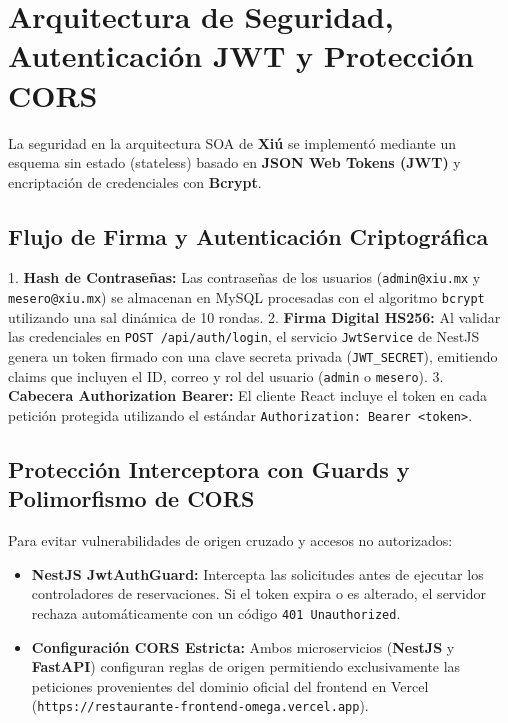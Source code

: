 \documentclass[12pt,a4paper]{article}
\begin{document}
\section{Arquitectura de Seguridad, Autenticación JWT y Protección CORS}

La seguridad en la arquitectura SOA de \textbf{Xiú} se implementó mediante un esquema sin estado (stateless) basado en \textbf{JSON Web Tokens (JWT)} y encriptación de credenciales con \textbf{Bcrypt}.

\subsection{Flujo de Firma y Autenticación Criptográfica}
1. \textbf{Hash de Contraseñas:} Las contraseñas de los usuarios (\texttt{admin@xiu.mx} y \texttt{mesero@xiu.mx}) se almacenan en MySQL procesadas con el algoritmo \texttt{bcrypt} utilizando una sal dinámica de 10 rondas.
2. \textbf{Firma Digital HS256:} Al validar las credenciales en \texttt{POST /api/auth/login}, el servicio \texttt{JwtService} de NestJS genera un token firmado con una clave secreta privada (\texttt{JWT\_SECRET}), emitiendo claims que incluyen el ID, correo y rol del usuario (\texttt{admin} o \texttt{mesero}).
3. \textbf{Cabecera Authorization Bearer:} El cliente React incluye el token en cada petición protegida utilizando el estándar \texttt{Authorization: Bearer <token>}.

\subsection{Protección Interceptora con Guards y Polimorfismo de CORS}
Para evitar vulnerabilidades de origen cruzado y accesos no autorizados:
\begin{itemize}[leftmargin=*]
  \item \textbf{NestJS JwtAuthGuard:} Intercepta las solicitudes antes de ejecutar los controladores de reservaciones. Si el token expira o es alterado, el servidor rechaza automáticamente con un código \texttt{401 Unauthorized}.
  \item \textbf{Configuración CORS Estricta:} Ambos microservicios (\textbf{NestJS} y \textbf{FastAPI}) configuran reglas de origen permitiendo exclusivamente las peticiones provenientes del dominio oficial del frontend en Vercel (\texttt{https://restaurante-frontend-omega.vercel.app}).
\end{itemize}
\end{document}
